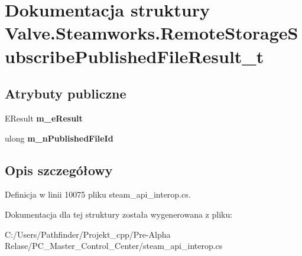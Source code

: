 \hypertarget{struct_valve_1_1_steamworks_1_1_remote_storage_subscribe_published_file_result__t}{}\section{Dokumentacja struktury Valve.\+Steamworks.\+Remote\+Storage\+Subscribe\+Published\+File\+Result\+\_\+t}
\label{struct_valve_1_1_steamworks_1_1_remote_storage_subscribe_published_file_result__t}
\subsection*{Atrybuty publiczne}
\begin{DoxyCompactItemize}
\item 
\mbox{\label{struct_valve_1_1_steamworks_1_1_remote_storage_subscribe_published_file_result__t_ae7b3c0ec2a80676dce0f015a2aacf2cb}} 
E\+Result {\bfseries m\+\_\+e\+Result}
\item 
\mbox{\label{struct_valve_1_1_steamworks_1_1_remote_storage_subscribe_published_file_result__t_a25b0857c57ace027fc67692ff9164d9e}} 
ulong {\bfseries m\+\_\+n\+Published\+File\+Id}
\end{DoxyCompactItemize}


\subsection{Opis szczegółowy}


Definicja w linii 10075 pliku steam\+\_\+api\+\_\+interop.\+cs.



Dokumentacja dla tej struktury została wygenerowana z pliku\+:\begin{DoxyCompactItemize}
\item 
C\+:/\+Users/\+Pathfinder/\+Projekt\+\_\+cpp/\+Pre-\/\+Alpha Relase/\+P\+C\+\_\+\+Master\+\_\+\+Control\+\_\+\+Center/steam\+\_\+api\+\_\+interop.\+cs\end{DoxyCompactItemize}

